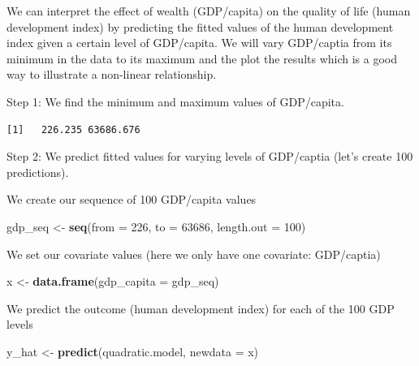\documentclass[]{article}
\newenvironment{Shaded}{\begin{snugshade}}{\end{snugshade}}
\newcommand{\DataTypeTok}[1]{\textcolor[rgb]{0.13,0.29,0.53}{#1}}
\newcommand{\DecValTok}[1]{\textcolor[rgb]{0.00,0.00,0.81}{#1}}
\newcommand{\KeywordTok}[1]{\textcolor[rgb]{0.13,0.29,0.53}{\textbf{#1}}}
\newcommand{\NormalTok}[1]{#1}
\newcommand{\OperatorTok}[1]{\textcolor[rgb]{0.81,0.36,0.00}{\textbf{#1}}}
\newcommand{\StringTok}[1]{\textcolor[rgb]{0.31,0.60,0.02}{#1}}
\begin{document}
We can interpret the effect of wealth (GDP/capita) on the quality of life (human development index) by predicting the fitted values of the human development index given a certain level of GDP/capita. We will vary GDP/captia from its minimum in the data to its maximum and the plot the results which is a good way to illustrate a non-linear relationship.

Step 1: We find the minimum and maximum values of GDP/capita.

\begin{Shaded}
\end{Shaded}

\begin{verbatim}
[1]   226.235 63686.676
\end{verbatim}

Step 2: We predict fitted values for varying levels of GDP/captia (let's create 100 predictions).

We create our sequence of 100 GDP/capita values

\begin{Shaded}
\begin{Highlighting}[]
\NormalTok{gdp_seq <-}\StringTok{ }\KeywordTok{seq}\NormalTok{(}\DataTypeTok{from =} \DecValTok{226}\NormalTok{, }\DataTypeTok{to =} \DecValTok{63686}\NormalTok{, }\DataTypeTok{length.out =} \DecValTok{100}\NormalTok{)}
\end{Highlighting}
\end{Shaded}

We set our covariate values (here we only have one covariate: GDP/captia)

\begin{Shaded}
\begin{Highlighting}[]
\NormalTok{x <-}\StringTok{ }\KeywordTok{data.frame}\NormalTok{(}\DataTypeTok{gdp_capita =}\NormalTok{ gdp_seq)}
\end{Highlighting}
\end{Shaded}

We predict the outcome (human development index) for each of the 100 GDP levels

\begin{Shaded}
\begin{Highlighting}[]
\NormalTok{y_hat <-}\StringTok{ }\KeywordTok{predict}\NormalTok{(quadratic.model, }\DataTypeTok{newdata =}\NormalTok{ x)}
\end{Highlighting}
\end{Shaded}
\end{document}
